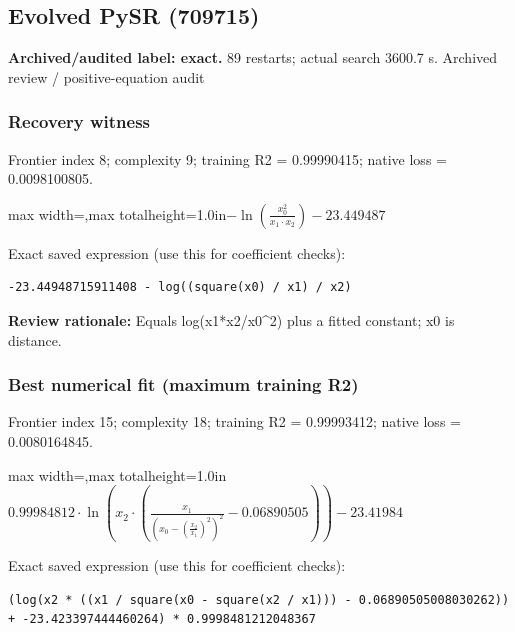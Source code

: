 \documentclass[10pt,letterpaper,landscape]{article}
\begin{document}
\begin{minipage}[t]{0.485\textwidth}
\subsection*{Evolved PySR (709715)}
\textbf{Archived/audited label: exact.} 89 restarts; actual search 3600.7 s.
{\small Archived review / positive-equation audit}
\subsubsection*{Recovery witness}
Frontier index 8; complexity 9; training R2 = 0.99990415; native loss = 0.0098100805.
\begin{center}\begin{adjustbox}{max width=\linewidth,max totalheight=1.0in}$\displaystyle - \ln{\left(\frac{x_{0}^{2}}{x_{1} \cdot x_{2}} \right)} - 23.449487$\end{adjustbox}\end{center}
{\scriptsize Exact saved expression (use this for coefficient checks):}
\begin{lstlisting}
-23.44948715911408 - log((square(x0) / x1) / x2)
\end{lstlisting}
{\small\textbf{Review rationale:} Equals log(x1*x2/x0\textasciicircum{}2) plus a fitted constant; x0 is distance.}
\subsubsection*{Best numerical fit (maximum training R2)}
Frontier index 15; complexity 18; training R2 = 0.99993412; native loss = 0.0080164845.
\begin{center}\begin{adjustbox}{max width=\linewidth,max totalheight=1.0in}$\displaystyle 0.99984812 \cdot \ln{\left(x_{2} \cdot \left(\frac{x_{1}}{\left(x_{0} - \left(\frac{x_{2}}{x_{1}}\right)^{2}\right)^{2}} - 0.06890505\right) \right)} - 23.41984$\end{adjustbox}\end{center}
{\scriptsize Exact saved expression (use this for coefficient checks):}
\begin{lstlisting}
(log(x2 * ((x1 / square(x0 - square(x2 / x1))) - 0.06890505008030262)) + -23.423397444460264) * 0.9998481212048367
\end{lstlisting}
\end{minipage}
\clearpage{}\label{newton-10006}
\end{document}
